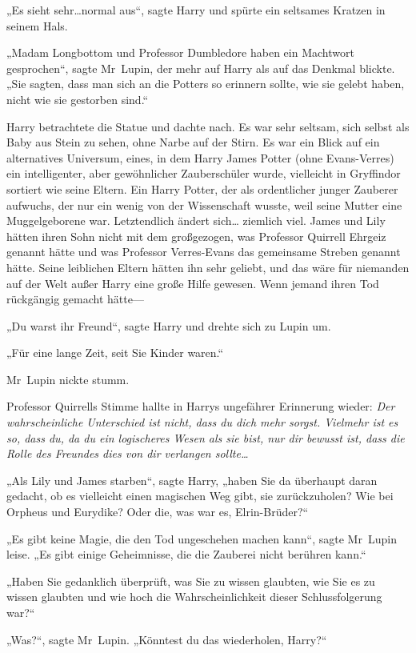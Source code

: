 {„Es sieht sehr…normal aus“, sagte Harry und spürte ein seltsames Kratzen in seinem Hals.

„Madam Longbottom und Professor Dumbledore haben ein Machtwort gesprochen“, sagte Mr~Lupin, der mehr auf Harry als auf das Denkmal blickte. „Sie sagten, dass man sich an die Potters so erinnern sollte, wie sie gelebt haben, nicht wie sie gestorben sind.“

Harry betrachtete die Statue und dachte nach. Es war sehr seltsam, sich selbst als Baby aus Stein zu sehen, ohne Narbe auf der Stirn. Es war ein Blick auf ein alternatives Universum, eines, in dem Harry James Potter (ohne Evans-Verres) ein intelligenter, aber gewöhnlicher Zauberschüler wurde, vielleicht in Gryffindor sortiert wie seine Eltern. Ein Harry Potter, der als ordentlicher junger Zauberer aufwuchs, der nur ein wenig von der Wissenschaft wusste, weil seine Mutter eine Muggelgeborene war. Letztendlich ändert sich… ziemlich viel. James und Lily hätten ihren Sohn nicht mit dem großgezogen, was Professor Quirrell Ehrgeiz genannt hätte und was Professor Verres-Evans das gemeinsame Streben genannt hätte. Seine leiblichen Eltern hätten ihn sehr geliebt, und das wäre für niemanden auf der Welt außer Harry eine große Hilfe gewesen. Wenn jemand ihren Tod rückgängig gemacht hätte—

„Du warst ihr Freund“, sagte Harry und drehte sich zu Lupin um.

„Für eine lange Zeit, seit Sie Kinder waren.“

Mr~Lupin nickte stumm.

Professor Quirrells Stimme hallte in Harrys ungefährer Erinnerung wieder: \emph{Der wahrscheinliche Unterschied ist nicht, dass du dich mehr sorgst. Vielmehr ist es so, dass du, da du ein logischeres Wesen als sie bist, nur dir bewusst ist, dass die Rolle des Freundes dies von dir verlangen sollte…}

„Als Lily und James starben“, sagte Harry, „haben Sie da überhaupt daran gedacht, ob es vielleicht einen magischen Weg gibt, sie zurückzuholen? Wie bei Orpheus und Eurydike? Oder die, was war es, Elrin-Brüder?“

„Es gibt keine Magie, die den Tod ungeschehen machen kann“, sagte Mr~Lupin leise. „Es gibt einige Geheimnisse, die die Zauberei nicht berühren kann.“

„Haben Sie gedanklich überprüft, was Sie zu wissen glaubten, wie Sie es zu wissen glaubten und wie hoch die Wahrscheinlichkeit dieser Schlussfolgerung war?“

„Was?“, sagte Mr~Lupin. „Könntest du das wiederholen, Harry?“

}
